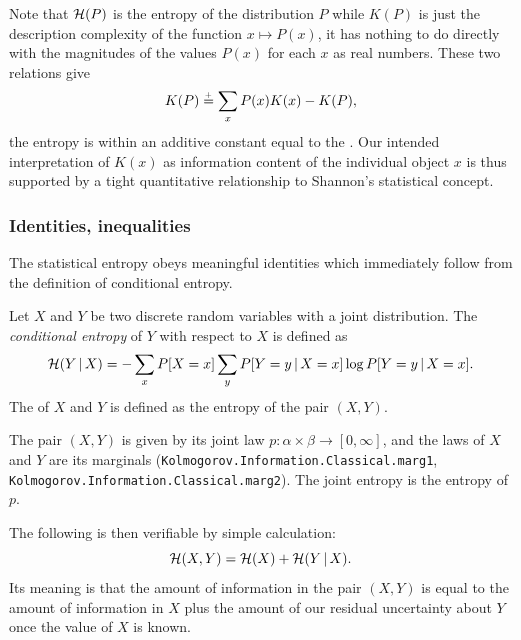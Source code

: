 Note that \( \mathcal{H}(P) \) is the entropy of the distribution \( P \) while \( K(P) \) is
just the description complexity of the function \( x \mapsto P(x) \), it has
nothing to do directly
with the magnitudes of the values \( P(x) \) for each \( x \) as real numbers.
These two relations give
 \[ 
K(P) \stackrel{{}_+}{=} \sum_{x} P(x)K(x) - K(P),
 \]
the entropy is within an additive constant equal to the
.
Our intended interpretation of \( K(x) \) as information content of the
individual object \( x \) is thus supported by a tight quantitative
relationship to Shannon's statistical concept.


\subsubsection{Identities, inequalities}
The statistical entropy obeys meaningful identities which immediately
follow from the definition of conditional entropy. 

 \begin{definition}
  \label{def:g3.1.2}
  \leanok
Let \( X \) and \( Y \) be two discrete random variables with a joint distribution.
 The \emph{conditional entropy} of \( Y \) with respect to \( X \) is defined as
 \[
     \mathcal{H}(Y \,\vert\, X) =
   -\sum_{x} P[X=x]\sum_y P[Y=y \,\vert\, X=x]\log P[Y=y \,\vert\, X=x].
 \]
The  of \( X \) and \( Y \) is defined as the entropy of
the pair \( (X,Y) \).
 \end{definition}

\begin{formalization}
The pair \( (X, Y) \) is given by its joint law \( p \colon \alpha \times \beta \to [0, \infty] \),
and the laws of \( X \) and \( Y \) are its marginals
(\texttt{Kolmogorov.Information.Classical.marg1}, \texttt{Kolmogorov.Information.Classical.marg2}).
The joint entropy is the entropy of \( p \).
\end{formalization}

The following  is then verifiable by simple calculation:
 \begin{equation}\label{eq:entraddit}
   \mathcal{H}(X,Y) = \mathcal{H}(X) + \mathcal{H}(Y \,\vert\, X).
 \end{equation}
  Its meaning is that the amount of information in the pair \( (X,Y) \) is
equal to the amount of information in \( X \) plus the amount of our
residual uncertainty about \( Y \) once the value of \( X \) is known.

